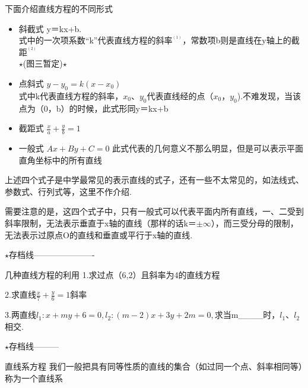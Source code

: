 下面介绍直线方程的不同形式
\begin{itemize}
\item 斜截式
y＝kx+b.
\\式中的一次项系数“k”代表直线方程的斜率$^{^{(1)}}$，常数项b则是直线在y轴上的截距$^{^{(2)}}$ 
\\ $\star$(图三暂定)$\star$
\item 点斜式
$y-y_0=k(x-x_0)$
\\式中k代表直线方程的斜率，$x_0$、$y_0$代表直线经的点（$x_0$，$y_0$).不难发现，当该点为（0，b）的时候，此式形同y＝kx+b
\item 截距式
$\frac{x}{a}+\frac{y}{b}=1$
\item 一般式
$Ax+By+C=0$
此式代表的几何意义不那么明显，但是可以表示平面直角坐标中的所有直线
\end{itemize}
上述四个式子是中学最常见的表示直线的式子，还有一些不太常见的，如法线式、参数式、行列式等，这里不作介绍.
\begin{issues}
需要注意的是，这四个式子中，只有一般式可以代表平面内所有直线，一、二受到斜率限制，无法表示垂直于x轴的直线（那样的话k＝$\pm \infty$），而三受分母的限制，无法表示过原点O的直线和垂直或平行于x轴的直线.
\end{issues}
$\star$存档线----------------------
\begin{exercise}{几种直线方程的利用}
1.求过点（6,2）且斜率为4的直线方程


2.求直线$\frac{x}{7}+\frac{y}{6}=1$斜率

3.两直线$l_1:x+my+6=0,l_2:(m-2)x+3y+2m=0,$求当m____时，$l_1$、$l_2$相交.
\end{exercise}
$\star$存档线---------

直线系方程
我们一般把具有同等性质的直线的集合（如过同一个点、斜率相同等）称为一个直线系
